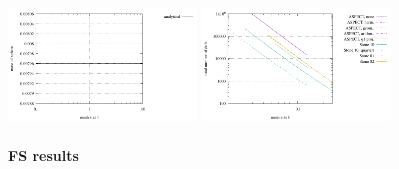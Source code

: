 \includegraphics[width=5cm]{images/stokes_sphere3D/mass_sphere}
\includegraphics[width=5cm]{images/stokes_sphere3D/dofs}

\newpage
\paragraph{FS results}

